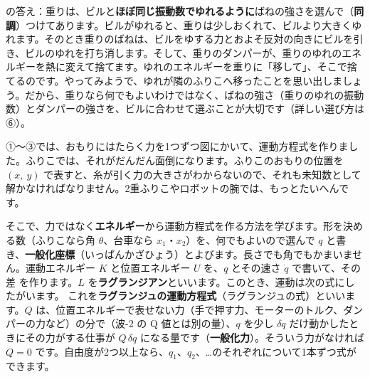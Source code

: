 \bkhatenaref の答え：重りは、ビルと\textbf{ほぼ同じ振動数でゆれるように}ばねの強さを選んで（\textbf{同調}）つけてあります。ビルがゆれると、重りは少しおくれて、ビルより大きくゆれます。そのとき重りのばねは、ビルをゆする力とおよそ反対の向きにビルを引き、ビルのゆれを打ち消します。そして、重りのダンパーが、重りのゆれのエネルギーを熱に変えて捨てます。ゆれのエネルギーを重りに「移して」、そこで捨てるのです。やってみようで、ゆれが隣のふりこへ移ったことを思い出しましょう。だから、重りなら何でもよいわけではなく、ばねの強さ（重りのゆれの振動数）とダンパーの強さを、ビルに合わせて選ぶことが大切です（詳しい選び方は⑥）。

\begin{phmodel}[動吸振器のついたビル]
\end{phmodel}

\phkokomade


\label{ph:波-3:sec4}
①〜③では、おもりにはたらく力を1つずつ図にかいて、運動方程式を作りました。ふりこでは、それがだんだん面倒になります。ふりこのおもりの位置を $(x,\ y)$ で表すと、糸が引く力の大きさがわからないので、それも未知数として解かなければなりません。2重ふりこやロボットの腕では、もっとたいへんです。

そこで、力ではなく\textbf{エネルギー}から運動方程式を作る方法を学びます。形を決める数（ふりこなら角 $\theta$、台車なら $x_1$・$x_2$）を、何でもよいので選んで $q$ と書き、\textbf{一般化座標}（いっぱんかざひょう）とよびます。長さでも角でもかまいません。運動エネルギー $K$ と位置エネルギー $U$ を、$q$ とその速さ $\dot q$ で書いて、その差
を作ります。$L$ を\textbf{ラグランジアン}といいます。このとき、運動は次の式にしたがいます。
これを\textbf{ラグランジュの運動方程式}（ラグランジュの式）といいます。$Q$ は、位置エネルギーで表せない力（手で押す力、モーターのトルク、ダンパーの力など）の分で（波-2 の Q 値とは別の量）、$q$ を少し $\delta q$ だけ動かしたときにその力がする仕事が $Q\,\delta q$ になる量です（\textbf{一般化力}）。そういう力がなければ $Q=0$ です。自由度が2つ以上なら、$q_1$、$q_2$、…のそれぞれについて1本ずつ式ができます。

